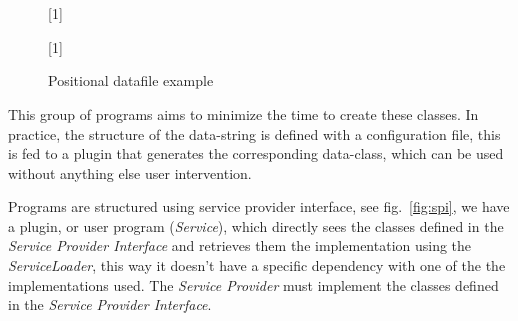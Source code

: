 \documentclass[a4paper,10pt]{report}
\begin{document}
\begin{figure}[!htb]
\centering\small
\scalebox{0.7}[1]{
\texttt{%
\fbox[lb]{ }%
\fbox[lb]{ }%
\fbox[lb]{ }%
\fbox[lb]{ }%
\fbox[lb]{ }%
\fbox[lb]{ }%
\fbox[lb]{ }%
\fbox[lb]{ }%
\fbox[lb]{ }%
\fbox[lb]{ }%
\fbox[lb]{ }%
\fbox[lb]{ }%
\fbox[lb]{ }%
\fbox[lb]{ }%
\fbox[lb]{ }%
\fbox[lb]{ }%
\fbox[lb]{ }%
\fbox[lb]{ }%
\fbox[lb]{ }%
\fbox[lb]{ }%
}}


\scalebox{0.7}[1]{
\texttt{%
\fbox[lb]{ }%
\fbox[lb]{ }%
\fbox[lb]{ }%
\fbox[lb]{ }%
\fbox[lb]{ }%
\fbox[lb]{ }%
\fbox[lb]{ }%
\fbox[lb]{ }%
\fbox[lb]{ }%
\fbox[lb]{ }%
\fbox[lb]{ }%
\fbox[lb]{ }%
\fbox[lb]{ }%
\fbox[lb]{ }%
\fbox[lb]{ }%
\fbox[lb]{ }%
\fbox[lb]{ }%
\fbox[lb]{ }%
\fbox[lb]{ }%
\fbox[lb]{ }%
\fbox[lb]{ }%
}}

\caption{Positional datafile example} 
\label{fig:str.data}
\end{figure}



This group of programs aims to minimize the time to create these classes. 
In practice, the structure of the data-string is defined with a configuration 
file, this is fed to a plugin that generates the corresponding data-class, 
which can be used without anything else user intervention.

Programs are structured using service provider interface, see 
fig.~\ref{fig:spi}, we have a plugin, or user program (\textsl{Service}), which 
directly sees the classes defined in the \textsl{Service Provider Interface} and 
retrieves them the implementation using the \textsl{ServiceLoader}, this way it 
doesn't have a specific dependency with one of the the implementations used. 
The \textsl{Service Provider} must implement the classes defined in the 
\textsl{Service Provider Interface}.
\end{document}
